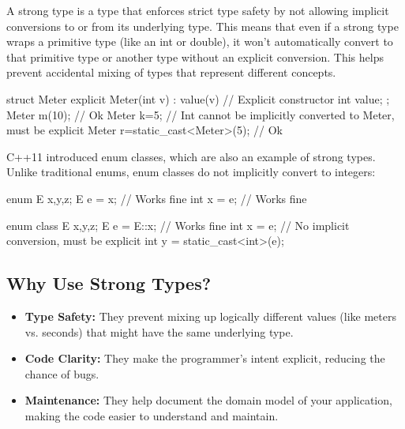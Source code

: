 \documentclass{report}
\begin{document}
\pagebreak 
{}
\bigbreak \noindent 
A strong type is a type that enforces strict type safety by not allowing implicit conversions to or from its underlying type. This means that even if a strong type wraps a primitive type (like an int or double), it won't automatically convert to that primitive type or another type without an explicit conversion. This helps prevent accidental mixing of types that represent different concepts.
\bigbreak \noindent 
\begin{cppcode}
    struct Meter {
        explicit Meter(int v) : value(v) {}  // Explicit constructor
        int value;
    };
    Meter m(10); // Ok
    Meter k=5; // Int cannot be implicitly converted to Meter, must be explicit
    Meter r=static_cast<Meter>(5);  // Ok
\end{cppcode}
\bigbreak \noindent 
C++11 introduced enum classes, which are also an example of strong types. Unlike traditional enums, enum classes do not implicitly convert to integers:
\bigbreak \noindent 
\begin{cppcode}
    enum E {x,y,z};
    E e = x; // Works fine
    int x = e; // Works fine
\end{cppcode}

\bigbreak \noindent 
\begin{cppcode}
    enum class E {x,y,z};
    E e = E::x; // Works fine
    int x = e; // No implicit conversion, must be explicit
    int y = static_cast<int>(e); 
\end{cppcode}

\bigbreak \noindent 
\subsection{Why Use Strong Types?}
\bigbreak \noindent 
\begin{itemize}
    \item \textbf{Type Safety:} They prevent mixing up logically different values (like meters vs. seconds) that might have the same underlying type.
    \item \textbf{Code Clarity:} They make the programmer’s intent explicit, reducing the chance of bugs.
    \item \textbf{Maintenance:} They help document the domain model of your application, making the code easier to understand and maintain.
\end{itemize}


\bigbreak \noindent 
\end{document}
